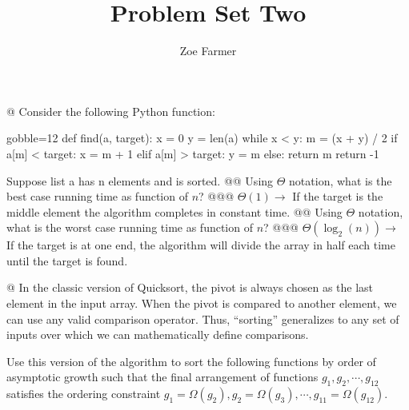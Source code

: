\documentclass[10pt]{article}
\title{Problem Set Two}
\author{Zoe Farmer}
\begin{document}
\maketitle

\begin{easylist}[enumerate]
    @ Consider the following Python function:

        \begin{pythoncode*}{gobble=12}
            def find(a, target):
                x = 0
                y = len(a)
                while x < y:
                    m = (x + y) / 2
                    if a[m] < target:
                        x = m + 1
                    elif a[m] > target:
                        y = m
                    else:
                        return m
            return -1
        \end{pythoncode*}

      Suppose list a has n elements and is sorted.
    @@ Using $\Theta$ notation, what is the best case running time as function of $n$?
    @@@ $\Theta(1) \to$ If the target is the middle element the algorithm completes in constant time.
    @@ Using $\Theta$ notation, what is the worst case running time as function of $n$?
    @@@ $\Theta(\log_2(n)) \to$ If the target is at one end, the algorithm will divide the array in half each time until the target is found.

    @ In the classic version of Quicksort, the pivot is always chosen as the last element in the input array. When the pivot is compared to another element, we can use any valid comparison operator. Thus, ``sorting'' generalizes to any set of inputs over which we can mathematically define comparisons.

    Use this version of the algorithm to sort the following functions by order of asymptotic growth such that the final arrangement of functions $g_1, g_2, \cdots, g_{12}$ satisfies the ordering constraint $g_1 = \Omega(g_2), g_2 = \Omega(g_3), \cdots, g_{11} = \Omega(g_{12})$.


\end{easylist}
\end{document}
